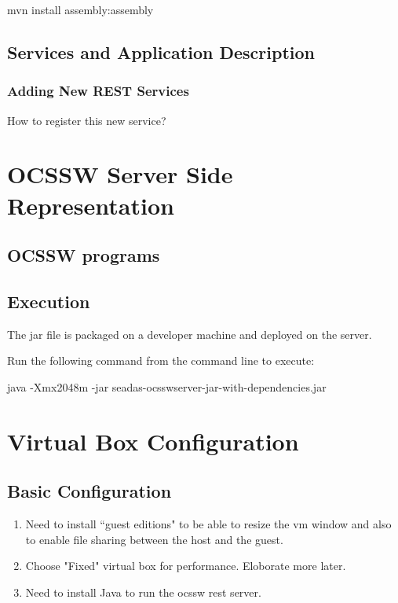 \documentclass[11pt, oneside]{article}   	%
\begin{document}
\begin{code}
mvn install assembly:assembly
\end{code}

\subsection{Services and Application Description}

\subsubsection{Adding New REST Services}
How to register this new service?

\section{\color{DarkOrange}OCSSW Server Side Representation}

\subsection{\color{DarkBlue} OCSSW programs}


\subsection{\color{DarkBlue} Execution}

The jar file is packaged on a developer machine and deployed on the server.

Run the following command from the command line to execute:
\begin{code}
﻿java -Xmx2048m -jar seadas-ocsswserver-jar-with-dependencies.jar
\end{code}


\section{\color{DarkGreen}Virtual Box Configuration}

\subsection{Basic Configuration}
\begin{enumerate}
\item Need to install ``guest editions" to be able to resize the vm window and also to enable file sharing between the host and the guest.
\item Choose "Fixed" virtual box for performance. Eloborate more later.
\item Need to install Java to run the ocssw rest server.
\end{enumerate}
\end{document}
